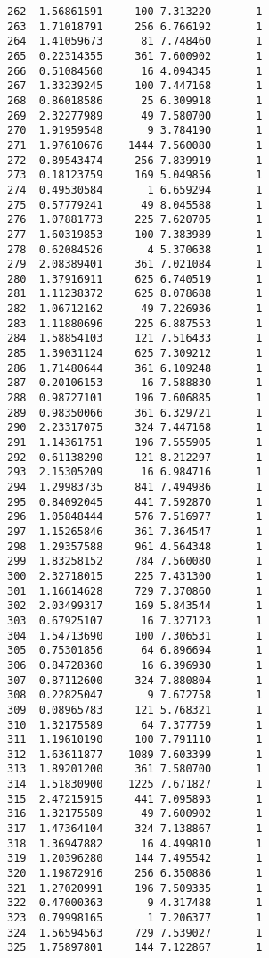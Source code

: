 \documentclass[
  letterpaper,
  DIV=11,
  numbers=noendperiod]{scrreprt}
\begin{document}
\begin{verbatim}
262  1.56861591     100 7.313220       1
263  1.71018791     256 6.766192       1
264  1.41059673      81 7.748460       1
265  0.22314355     361 7.600902       1
266  0.51084560      16 4.094345       1
267  1.33239245     100 7.447168       1
268  0.86018586      25 6.309918       1
269  2.32277989      49 7.580700       1
270  1.91959548       9 3.784190       1
271  1.97610676    1444 7.560080       1
272  0.89543474     256 7.839919       1
273  0.18123759     169 5.049856       1
274  0.49530584       1 6.659294       1
275  0.57779241      49 8.045588       1
276  1.07881773     225 7.620705       1
277  1.60319853     100 7.383989       1
278  0.62084526       4 5.370638       1
279  2.08389401     361 7.021084       1
280  1.37916911     625 6.740519       1
281  1.11238372     625 8.078688       1
282  1.06712162      49 7.226936       1
283  1.11880696     225 6.887553       1
284  1.58854103     121 7.516433       1
285  1.39031124     625 7.309212       1
286  1.71480644     361 6.109248       1
287  0.20106153      16 7.588830       1
288  0.98727101     196 7.606885       1
289  0.98350066     361 6.329721       1
290  2.23317075     324 7.447168       1
291  1.14361751     196 7.555905       1
292 -0.61138290     121 8.212297       1
293  2.15305209      16 6.984716       1
294  1.29983735     841 7.494986       1
295  0.84092045     441 7.592870       1
296  1.05848444     576 7.516977       1
297  1.15265846     361 7.364547       1
298  1.29357588     961 4.564348       1
299  1.83258152     784 7.560080       1
300  2.32718015     225 7.431300       1
301  1.16614628     729 7.370860       1
302  2.03499317     169 5.843544       1
303  0.67925107      16 7.327123       1
304  1.54713690     100 7.306531       1
305  0.75301856      64 6.896694       1
306  0.84728360      16 6.396930       1
307  0.87112600     324 7.880804       1
308  0.22825047       9 7.672758       1
309  0.08965783     121 5.768321       1
310  1.32175589      64 7.377759       1
311  1.19610190     100 7.791110       1
312  1.63611877    1089 7.603399       1
313  1.89201200     361 7.580700       1
314  1.51830900    1225 7.671827       1
315  2.47215915     441 7.095893       1
316  1.32175589      49 7.600902       1
317  1.47364104     324 7.138867       1
318  1.36947882      16 4.499810       1
319  1.20396280     144 7.495542       1
320  1.19872916     256 6.350886       1
321  1.27020991     196 7.509335       1
322  0.47000363       9 4.317488       1
323  0.79998165       1 7.206377       1
324  1.56594563     729 7.539027       1
325  1.75897801     144 7.122867       1

\end{verbatim}
\end{document}
